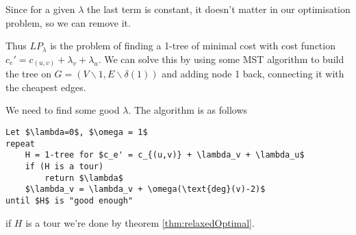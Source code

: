 Since for a given $\lambda$ the last term is constant, it doesn't matter in our optimisation problem, so we can remove it.

Thus $LP_\lambda$ is the problem of finding a 1-tree of minimal cost with cost function $c_e' = c_{(u,v)} + \lambda_v + \lambda_u$. We can solve this by using some MST algorithm to build the tree on $G=(V\backslash {1},E\backslash \delta(1))$ and adding node 1 back, connecting it with the cheapest edges.

We need to find some good $\lambda$. The algorithm is as follows

\begin{lstlisting}
Let $\lambda=0$, $\omega = 1$
repeat
	H = 1-tree for $c_e' = c_{(u,v)} + \lambda_v + \lambda_u$
	if (H is a tour)
		return $\lambda$
	$\lambda_v = \lambda_v + \omega(\text{deg}(v)-2)$
until $H$ is "good enough"
\end{lstlisting}

if $H$ is a tour we're done by theorem \ref{thm:relaxedOptimal}.
